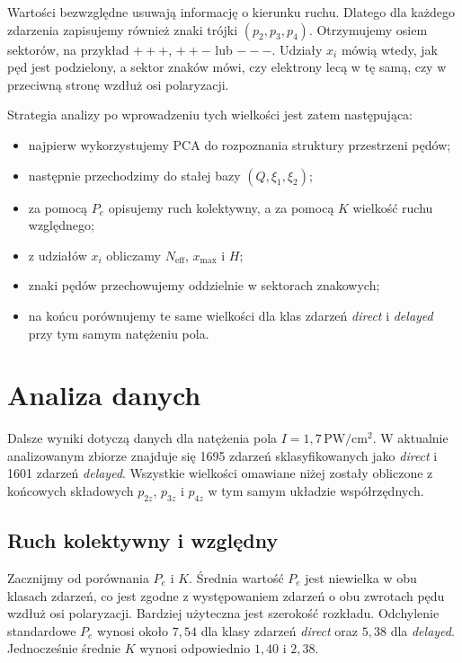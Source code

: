 \documentclass[12pt,letterpaper,oneside]{report}
\numberwithin{equation}{chapter}
\numberwithin{figure}{chapter}
\numberwithin{table}{chapter}
\newcommand{\direct}{\textit{direct}}
\newcommand{\delayed}{\textit{delayed}}
\begin{document}
Wartości bezwzględne usuwają informację o kierunku ruchu. Dlatego dla każdego zdarzenia zapisujemy również znaki trójki $(p_2,p_3,p_4)$. Otrzymujemy osiem sektorów, na przykład $+++$, $++-$ lub $---$. Udziały $x_i$ mówią wtedy, jak pęd jest podzielony, a sektor znaków mówi, czy elektrony lecą w tę samą, czy w przeciwną stronę wzdłuż osi polaryzacji.

Strategia analizy po wprowadzeniu tych wielkości jest zatem następująca:
\begin{itemize}
    \item najpierw wykorzystujemy PCA do rozpoznania struktury przestrzeni pędów;
    \item następnie przechodzimy do stałej bazy $(Q,\xi_1,\xi_2)$;
    \item za pomocą $P_e$ opisujemy ruch kolektywny, a za pomocą $K$ wielkość ruchu względnego;
    \item z udziałów $x_i$ obliczamy $N_{\mathrm{eff}}$, $x_{\max}$ i $H$;
    \item znaki pędów przechowujemy oddzielnie w sektorach znakowych;
    \item na końcu porównujemy te same wielkości dla klas zdarzeń \direct{} i \delayed{} przy tym samym natężeniu pola.
\end{itemize}

\chapter{Analiza danych}

Dalsze wyniki dotyczą danych dla natężenia pola $I=1{,}7\,\mathrm{PW/cm^2}$. W aktualnie analizowanym zbiorze znajduje się 1695 zdarzeń sklasyfikowanych jako \direct{} i 1601 zdarzeń \delayed{}. Wszystkie wielkości omawiane niżej zostały obliczone z końcowych składowych $p_{2z}$, $p_{3z}$ i $p_{4z}$ w tym samym układzie współrzędnych.

\section{Ruch kolektywny i względny}

Zacznijmy od porównania $P_e$ i $K$. Średnia wartość $P_e$ jest niewielka w obu klasach zdarzeń, co jest zgodne z występowaniem zdarzeń o obu zwrotach pędu wzdłuż osi polaryzacji. Bardziej użyteczna jest szerokość rozkładu. Odchylenie standardowe $P_e$ wynosi około $7{,}54$ dla klasy zdarzeń \direct{} oraz $5{,}38$ dla \delayed{}. Jednocześnie średnie $K$ wynosi odpowiednio $1{,}40$ i $2{,}38$.
\end{document}
